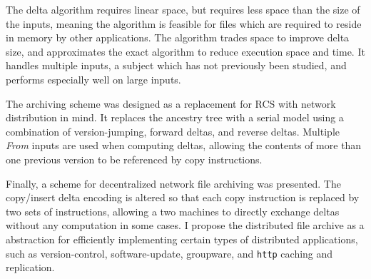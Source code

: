 \documentclass{llncs}
\begin{document}
The \xd {} delta algorithm requires linear space, but requires less space
than the size of the inputs, meaning the algorithm is feasible for
files which are required to reside in memory by other applications.
The algorithm trades space to improve delta size, and approximates the
exact algorithm to reduce execution space and time.  It handles
multiple inputs, a subject which has not previously been studied, and
performs especially well on large inputs.

The \xd {} archiving scheme was designed as a replacement for RCS with
network distribution in mind.  It replaces the ancestry tree with a
serial model using a combination of version-jumping, forward deltas,
and reverse deltas.  Multiple \emph{From} inputs are used when
computing deltas, allowing the contents of more than one previous
version to be referenced by copy instructions.

Finally, a scheme for decentralized network file archiving was
presented.  The copy/insert delta encoding is altered so that each
copy instruction is replaced by two sets of instructions, allowing a
two machines to directly exchange deltas without any computation in
some cases.  I propose the distributed file archive as a abstraction
for efficiently implementing certain types of distributed
applications, such as version-control, software-update, groupware, and
\texttt{http} caching and replication.


\end{document}
